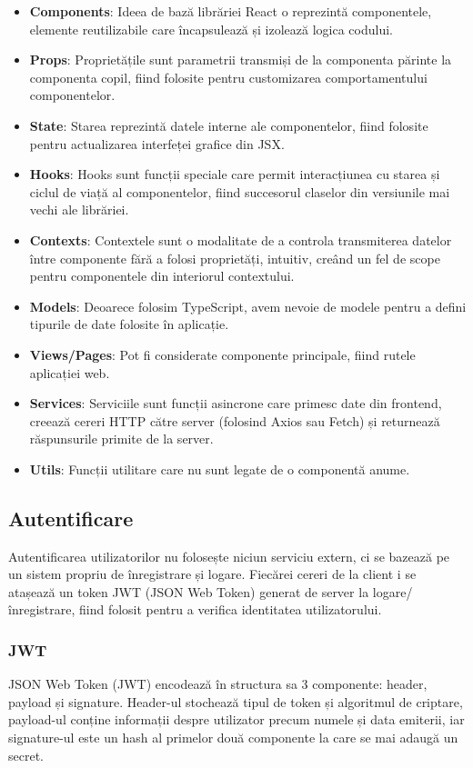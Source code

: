 \begin{itemize}
    \item \textbf{Components}: Ideea de bază librăriei React o reprezintă componentele, elemente
    reutilizabile care încapsulează și izolează logica codului.
    \item \textbf{Props}: Proprietățile sunt parametrii transmiși de la componenta părinte
    la componenta copil, fiind folosite pentru customizarea comportamentului componentelor.
    \item \textbf{State}: Starea reprezintă datele interne ale componentelor, fiind folosite pentru
    actualizarea interfeței grafice din JSX.
    \item \textbf{Hooks}: Hooks sunt funcții speciale care permit interacțiunea cu starea și ciclul
    de viață al componentelor, fiind succesorul claselor din versiunile mai vechi ale librăriei.
    \item \textbf{Contexts}: Contextele sunt o modalitate de a controla transmiterea datelor între
    componente fără a folosi proprietăți, intuitiv, creând un fel de scope pentru componentele din
    interiorul contextului.
    \item \textbf{Models}: Deoarece folosim TypeScript, avem nevoie de modele pentru a defini tipurile
    de date folosite în aplicație.
    \item \textbf{Views/Pages}: Pot fi considerate componente principale, fiind rutele aplicației web.
    \item \textbf{Services}: Serviciile sunt funcții asincrone care primesc date din frontend,
    creează cereri HTTP către server (folosind Axios sau Fetch) și returnează răspunsurile
    primite de la server.
    \item \textbf{Utils}: Funcții utilitare care nu sunt legate de o componentă anume.
\end{itemize}

\subsection{Autentificare}
Autentificarea utilizatorilor nu folosește niciun serviciu extern, ci se bazează pe un sistem
propriu de înregistrare și logare. Fiecărei cereri de la client i se atașează un token JWT
(JSON Web Token) generat de server la logare/înregistrare, fiind folosit pentru a verifica
identitatea utilizatorului. 

\subsubsection{JWT}
JSON Web Token (JWT) encodează în structura sa 3 componente: header, payload și signature.
Header-ul stochează tipul de token și algoritmul de criptare, payload-ul conține informații
despre utilizator precum numele și data emiterii, iar signature-ul este un hash al primelor
două componente la care se mai adaugă un secret.

